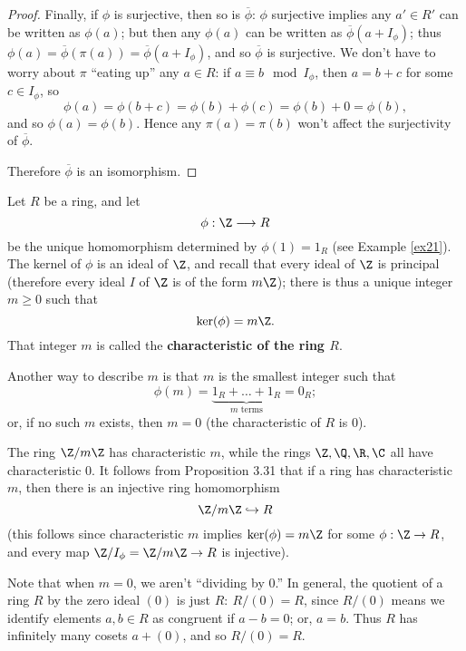 \documentclass[math1530-lecture-notes]{subfiles}
\begin{document}
\begin{proof}[Proof]
  Finally, if $\phi$ is surjective, then so is $\overline{\phi}$: $\phi$ surjective implies any
  $a'\in R'$ can be written as $\phi(a)$; but then any $\phi(a)$ can be written as
  $\overline{\phi}(a+I_\phi)$; thus $\phi(a)=\overline{\phi}(\pi(a))=\overline{\phi}(a+I_\phi)$, and
  so $\overline{\phi}$ is surjective. We don't have to worry about $\pi$ ``eating up'' any $a\in R$:
  if $a\equiv b\mod{I_\phi}$, then $a=b+c$ for some $c\in I_\phi$, so \[
    \phi(a)=\phi(b+c)=\phi(b)+\phi(c)=\phi(b)+0=\phi(b)
  ,\] and so $\phi(a)=\phi(b)$. Hence any $\pi(a)=\pi(b)$ won't affect the surjectivity of
  $\overline{\phi}$.

  Therefore $\overline{\phi}$ is an isomorphism.
\end{proof}

\begin{definition}{}
  Let $R$ be a ring, and let \[
    \phi:\Z\longrightarrow R
  \] be the unique homomorphism determined by $\phi(1)=1_R$ (see Example \ref{ex21}). The kernel of
  $\phi$ is an ideal of $\Z$, and recall that every ideal of $\Z$ is principal (therefore every
  ideal $I$ of $\Z$ is of the form $m\Z$); there is thus a unique integer $m\ge 0$ such that  \[
    \ker(\phi)=m\Z
  .\] That integer $m$ is called the \textbf{characteristic of the ring $R$}. 
\end{definition}

Another way to describe $m$ is that $m$ is the smallest integer such that \[
\phi(m)=\underbrace{1_R+\ldots+1_R}_\text{$m$ terms}=0_R
;\] or, if no such $m$ exists, then $m=0$ (the characteristic of $R$ is $0$).

\begin{example}
  The ring $\Z / m\Z$ has characteristic $m$, while the rings $\Z,\Q,\R,\C$ all have characteristic
  $0$. It follows from Proposition 3.31 that if a ring has characteristic $m$, then there is an
  injective ring homomorphism  \[
    \Z / m\Z \hookrightarrow R
  \] (this follows since characteristic $m$ implies $\ker(\phi)=m\Z$ for some $\phi: \Z\to R$, and
  every map $\Z / I_\phi=\Z/m\Z\to R$ is injective).
\end{example}

Note that when $m=0$, we aren't ``dividing by $0$.'' In general, the quotient of a ring $R$ by the
zero ideal $(0)$ is just $R:\ R / (0) = R$, since $R / (0)$ means we identify elements $a,b\in R$ as
congruent if $a-b=0$; or, $a=b$. Thus $R$ has infinitely many cosets $a+(0)$, and so $R / (0) =
R$.\\
\end{document}
